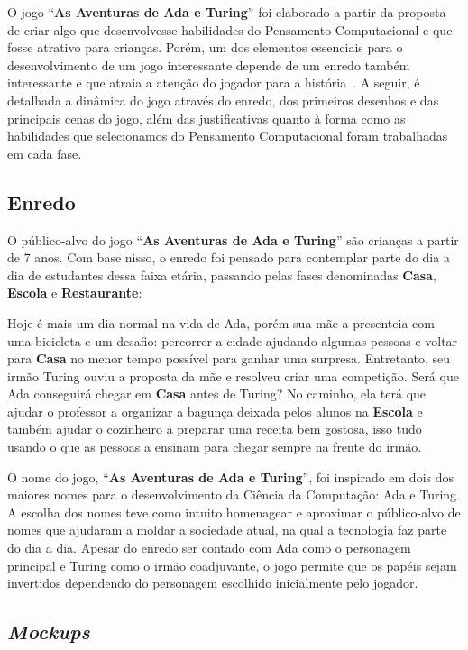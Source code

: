 O jogo “\textbf{As Aventuras de Ada e Turing}” foi elaborado a partir da proposta de criar algo que desenvolvesse habilidades do Pensamento Computacional e que fosse atrativo para crianças. Porém, um dos elementos essenciais para o desenvolvimento de um jogo interessante depende de um enredo também interessante e que atraia a atenção do jogador para a história~\cite{arruda2014fundamentos}. A seguir, é detalhada a dinâmica do jogo através do enredo, dos primeiros desenhos e das principais cenas do jogo, além das justificativas quanto à forma como as habilidades que selecionamos do Pensamento Computacional foram trabalhadas em cada fase.

\subsection{Enredo} \label{ssec:enredo}

O público-alvo do jogo “\textbf{As Aventuras de Ada e Turing}” são crianças a partir de 7 anos. Com base nisso, o enredo foi pensado para contemplar parte do dia a dia de estudantes dessa faixa etária, passando pelas fases denominadas \textbf{Casa}, \textbf{Escola} e \textbf{Restaurante}:

Hoje é mais um dia normal na vida de Ada, porém sua mãe a presenteia com uma bicicleta e um desafio: percorrer a cidade ajudando algumas pessoas e voltar para \textbf{Casa} no menor tempo possível para ganhar uma surpresa. Entretanto, seu irmão Turing ouviu a proposta da mãe e resolveu criar uma competição. Será que Ada conseguirá chegar em \textbf{Casa} antes de Turing? No caminho, ela terá que ajudar o professor a organizar a bagunça deixada pelos alunos na \textbf{Escola} e também ajudar o cozinheiro a preparar uma receita bem gostosa, isso tudo usando o que as pessoas a ensinam para chegar sempre na frente do irmão.

O nome do jogo, “\textbf{As Aventuras de Ada e Turing}”, foi inspirado em dois dos maiores nomes para o desenvolvimento da Ciência da Computação: Ada e Turing. A escolha dos nomes teve como intuito homenagear e aproximar o público-alvo de nomes que ajudaram a moldar a sociedade atual, na qual a tecnologia faz parte do dia a dia. Apesar do enredo ser contado com Ada como o personagem principal e Turing como o irmão coadjuvante, o jogo permite que os papéis sejam invertidos dependendo do personagem escolhido inicialmente pelo jogador.

\subsection{\textit{Mockups}} \label{ssec:mockups}

